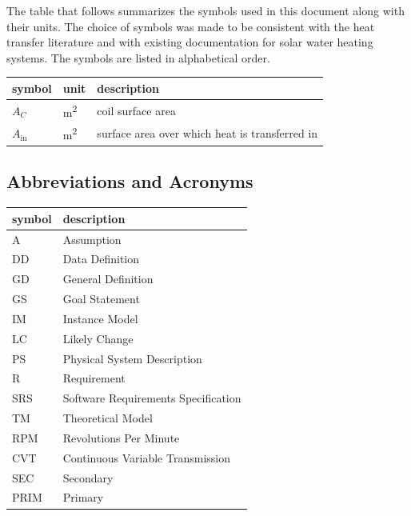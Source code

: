 \documentclass[12pt]{article}
\begin{document}
The table that follows summarizes the symbols used in this document along with
their units.  The choice of symbols was made to be consistent with the heat
transfer literature and with existing documentation for solar water heating
systems.  The symbols are listed in alphabetical order.

\renewcommand{\arraystretch}{1.2}
\noindent \begin{longtable*}{l l p{12cm}} \toprule
\textbf{symbol} & \textbf{unit} & \textbf{description}\\
\midrule 
$A_C$ & \si[per-mode=symbol] {\square\metre} & coil surface area
\\
$A_\text{in}$ & \si[per-mode=symbol] {\square\metre} & surface area over 
which heat is transferred in
\\ 
\bottomrule
\end{longtable*}

\subsection{Abbreviations and Acronyms}

\renewcommand{\arraystretch}{1.2}
\begin{tabular}{l l} 
  \toprule		
  \textbf{symbol} & \textbf{description}\\
  \midrule 
  A & Assumption\\
  DD & Data Definition\\
  GD & General Definition\\
  GS & Goal Statement\\
  IM & Instance Model\\
  LC & Likely Change\\
  PS & Physical System Description\\
  R & Requirement\\
  SRS & Software Requirements Specification\\
  TM & Theoretical Model\\
  RPM & Revolutions Per Minute\\
  CVT & Continuous Variable Transmission\\
  SEC & Secondary\\
  PRIM & Primary\\
  \bottomrule
\end{tabular}\\
\end{document}

